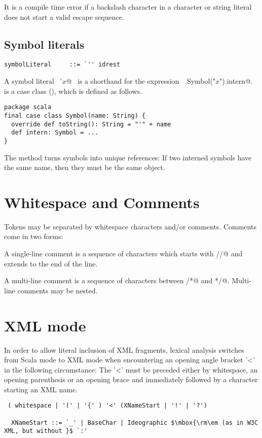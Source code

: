 It is a compile time error if a backslash character in a character or
string literal does not start a valid escape sequence.

\subsection{Symbol literals}

\syntax\begin{lstlisting}
symbolLiteral     ::= `'' idrest
\end{lstlisting}

A symbol literal ~\lstinline@'$x$@~ is a shorthand for the expression
~\lstinline@scala.Symbol("$x$").intern@. \lstinline@Symbol@ is a case class
(), which is defined as follows.
\begin{lstlisting}
package scala
final case class Symbol(name: String) {
  override def toString(): String = "'" + name
  def intern: Symbol = ...
}
\end{lstlisting}
The \lstinline@intern@ method turns symbols into unique references: If
two interned symbols have the same name, then they must be the same
object.

\section{Whitespace and Comments}

Tokens may be separated by whitespace characters
and/or comments. Comments come in two forms:

A single-line comment is a sequence of characters which starts with
\lstinline@//@ and extends to the end of the line.

A multi-line comment is a sequence of characters between \lstinline@/*@ and
\lstinline@*/@. Multi-line comments may be nested.

\section{XML mode\label{sec::xmlMode}}

In order to allow literal inclusion of XML fragments, lexical analysis
switches from Scala mode to XML mode when encountering an opening
angle bracket '<' in the following circumstance: The '<' must be
preceded either by whitespace, an opening parenthesis or an opening
brace and immediately followed by a character starting an XML name.

\syntax\begin{lstlisting}
 ( whitespace | '(' | '{' ) '<' (XNameStart | '!' | '?')

  XNameStart ::= `_' | BaseChar | Ideographic $\mbox{\rm\em (as in W3C XML, but without }$ `:'
\end{lstlisting}


